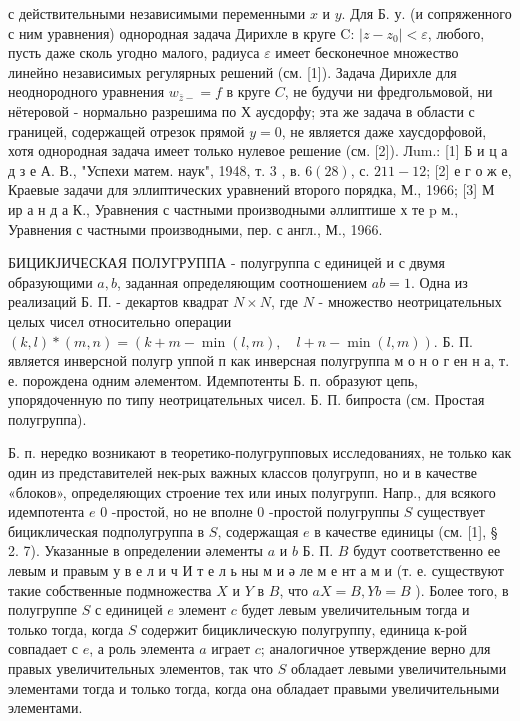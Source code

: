 \documentclass[10pt]{article}
\begin{document}
с действительными независимыми переменными $x$ и $y$. Для Б. у. (и сопряженного с ним уравнения) однородная задача Дирихле в круге C: $\left|z-z_{0}\right|<\varepsilon$, любого, пусть даже сколь угодно малого, радиуса $\varepsilon$ имеет бесконечное множество линейно независимых регулярных решений (см. [1]). Задача Дирихле для неоднородного уравнения $w_{\bar{z}-}=f$ в круге $C$, не будучи ни фредгольмовой, ни нётеровой - нормально разрешима по Х аусдорфу; эта же задача в области с границей, содержащей отрезок прямой $y=0$, не является даже хаусдорфовой, хотя однородная задача имеет только нулевое решение (см. [2]). Лum.: [1] Б и ц а д з е А. В., "Успехи матем. наук", 1948, т. 3 , в. $6(28)$, с. $211-12$; [2] е г о ж е, Краевые задачи для эллиптических уравнений второго порядка, М., 1966; [3] М ир а н д а К., Уравнения с частными производными әллиптише х те p м., Уравнения с частными производными, пер. с англ., М., 1966.



БИЦИКЈИЧЕСКАЯ ПОЛУГРУППА - полугруппа с единицей и с двумя образующими $a, b$, заданная определяющим соотношением $a b=1$. Одна из реализаций Б. П. - декартов квадрат $N \times N$, где $N$ - множество неотрицательных целых чисел относительно операции $(k, l) *(m, n)=(k+m-\min (l, m), \quad l+n-\min (l, m))$. Б. П. является инверсной полугр уппой п как инверсная полугруппа м о н о г ен н а, т. е. порождена одним әлементом. Идемпотенты Б. п. образуют цепь, упорядоченную по типу неотрицательных чисел. Б. П. бипроста (см. Простая полугруппа).



Б. п. нередко возникают в теоретико-полугрупповых исследованиях, не только как один из представителей нек-рых важных классов пุолугрупп, но и в качестве «блоков», определяющих строение тех или иных полугрупп. Напр., для всякого идемпотента $e$ 0 -простой, но не вполне 0 -простой полугруппы $S$ существует бициклическая подполугруппа в $S$, содержащая $e$ в качестве единицы (см. [1], § 2. 7). Указанные в определении әлементы $a$ и $b$ Б. П. $B$ будут соответственно ее левым и правым у в е л и ч И т е л ь ны м и ә ле м е нт а м и (т. е. существуют такие собственные подмножества $X$ и $Y$ в $B$, что $a X=B, Y b=B$ ). Более того, в полугруппе $S$ с единицей $e$ элемент $c$ будет левым увеличительным тогда и только тогда, когда $S$ содержит бициклическую полугруппу, единица к-рой совпадает с $e$, а роль элемента $a$ играет $c$; аналогичное утверждение верно для правых увеличительных элементов, так что $S$ обладает левыми увеличительными элементами тогда и только тогда, когда она обладает правыми увеличительными элементами.
\end{document}
